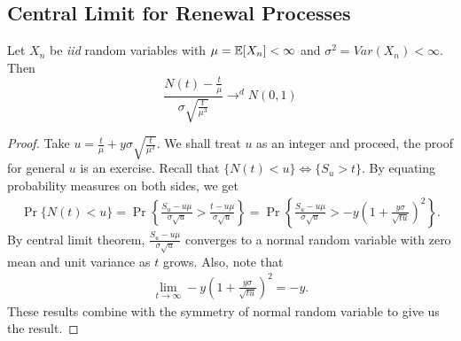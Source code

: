 \documentclass[a4paper,10pt, english]{article}
\begin{document}
\subsection{Central Limit for Renewal Processes}
\begin{thm}
Let $X_n$ be \emph{iid} random variables with $\mu = \mathbb{E}[X_n] < \infty$ and $\sigma^2 = Var(X_n) < \infty$. Then
\[\frac{N(t)-\frac{t}{\mu}}{\sigma \sqrt{\frac{t}{\mu^3}}} \to^d N(0,1) \]
\end{thm}
\begin{proof}
Take $u = \frac{t}{\mu} + y \sigma \sqrt{\frac{t}{\mu^3}}$. We shall treat $u$ as an integer and proceed, the proof for general $u$ is an exercise. Recall that $\{N(t) < u\} \iff \{S_u > t\}$. By equating probability measures on both sides, we get
\begin{align*}
\Pr\{N(t) < u\} = \Pr\left\{\frac{S_u - u\mu}{\sigma \sqrt{u}} > \frac{t - u\mu}{\sigma \sqrt{u}}\right\} = \Pr\left\{\frac{S_u - u\mu}{\sigma \sqrt{u}} > -y\left(1 + \frac{y\sigma}{\sqrt{tu}}\right)^2\right\}.
\end{align*}
By central limit theorem, $\frac{S_u - u\mu}{\sigma \sqrt{u}}$ converges to a normal random variable with zero mean and unit variance as $t$ grows. Also, note that 
\begin{align*}
\lim_{t \to \infty} -y\left(1 + \frac{y\sigma}{\sqrt{tu}}\right)^2 = -y.
\end{align*}
These results combine with the symmetry of normal random variable to give us the result.
\end{proof}
\end{document}

